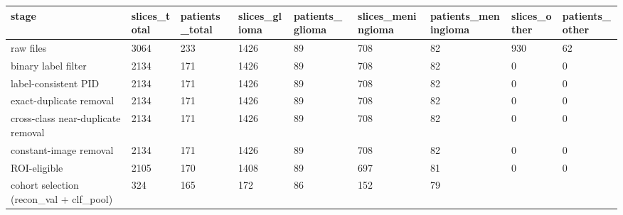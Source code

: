 \begin{tabular}{lllllllll}
\hline
stage & slices\_total & patients\_total & slices\_glioma & patients\_glioma & slices\_meningioma & patients\_meningioma & slices\_other & patients\_other \\
\hline
raw files & 3064 & 233 & 1426 & 89 & 708 & 82 & 930 & 62 \\
binary label filter & 2134 & 171 & 1426 & 89 & 708 & 82 & 0 & 0 \\
label-consistent PID & 2134 & 171 & 1426 & 89 & 708 & 82 & 0 & 0 \\
exact-duplicate removal & 2134 & 171 & 1426 & 89 & 708 & 82 & 0 & 0 \\
cross-class near-duplicate removal & 2134 & 171 & 1426 & 89 & 708 & 82 & 0 & 0 \\
constant-image removal & 2134 & 171 & 1426 & 89 & 708 & 82 & 0 & 0 \\
ROI-eligible & 2105 & 170 & 1408 & 89 & 697 & 81 & 0 & 0 \\
cohort selection (recon\_val + clf\_pool) & 324 & 165 & 172 & 86 & 152 & 79 &  &  \\
\hline
\end{tabular}
